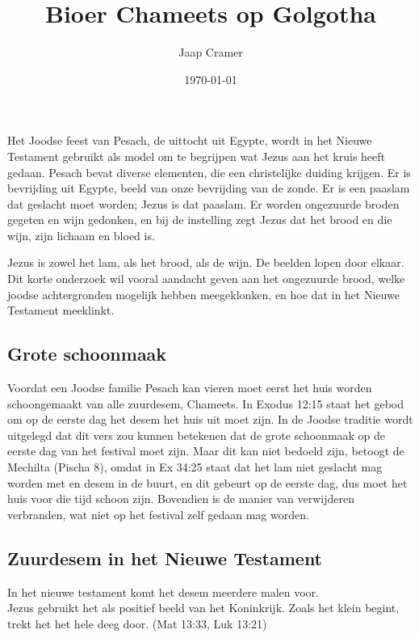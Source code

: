 \documentclass[a4paper,11pt]{article}
\title{Bioer Chameets op Golgotha}
\author{Jaap Cramer}
\date{\today}
\begin{document}
\maketitle

Het Joodse feest van Pesach, de uittocht uit Egypte, wordt in het Nieuwe Testament gebruikt als model om te begrijpen wat Jezus aan het kruis heeft gedaan. Pesach bevat diverse elementen, die een christelijke duiding krijgen. Er is bevrijding uit Egypte, beeld van onze bevrijding van de zonde. Er is een paaslam dat geslacht moet worden; Jezus is dat paaslam. Er worden ongezuurde broden gegeten en wijn gedonken, en bij de instelling zegt Jezus dat het brood en die wijn, zijn lichaam en bloed is.

Jezus is zowel het lam, als het brood, als de wijn. De beelden lopen door elkaar.
Dit korte onderzoek wil vooral aandacht geven aan het ongezuurde brood, welke joodse achtergronden mogelijk hebben meegeklonken, en hoe dat in het Nieuwe Testament meeklinkt.



\subsection*{Grote schoonmaak}
Voordat een Joodse familie Pesach kan vieren moet eerst het huis worden schoongemaakt van alle zuurdesem, Chameets.
In Exodus 12:15 staat het gebod om op de eerste dag het desem het huis uit moet zijn.
In de Joodse traditie wordt uitgelegd dat dit vers zou kunnen betekenen dat de grote schoonmaak op de eerste dag van het festival moet zijn. Maar dit kan niet bedoeld zijn, betoogt de Mechilta (Pischa 8), omdat in Ex 34:25 staat dat het lam niet geslacht mag worden met en desem in de buurt, en dit gebeurt op de eerste dag, dus moet het huis voor die tijd schoon zijn. Bovendien is de manier van verwijderen verbranden, wat niet op het festival zelf gedaan mag worden. 

\subsection*{Zuurdesem in het Nieuwe Testament}
In het nieuwe testament komt het desem meerdere malen voor.\\
Jezus gebruikt het als positief beeld van het Koninkrijk. Zoals het klein begint, trekt het het hele deeg door. (Mat 13:33, Luk 13:21)
\end{document}
